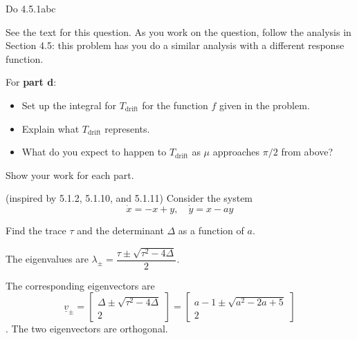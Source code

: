 \documentclass[12pt,letterpaper]{exam}
\begin{document}
\begin{questions}
\question Do 4.5.1abc

See the text for this question.  As you work on the question, follow the analysis in Section 4.5: this problem has you do a similar analysis with a different response function.

For \textbf{part d}: 
\begin{itemize}
    \item Set up the integral for $T_{\text{drift}}$ for the function $f$ given in the problem.
    \item Explain what $T_{\text{drift}}$ represents.
    \item What do you expect to happen to $T_{\text{drift}}$ as $\mu$ approaches $\pi/2$ from above?
\end{itemize}
  





Show your work for each part. 

\item (inspired by 5.1.2, 5.1.10, and 5.1.11) Consider the system
\[\dot x=-x+y,\quad \dot y=x-ay\] 
	\begin{parts}
	\item Find the trace $\tau$ and the determinant $\Delta$ as a function of $a$.
 \end{parts}
 
 The eigenvalues are $\lambda_\pm=\dfrac{\tau\pm\sqrt{\tau^2-4\Delta}}{2}$.  
 
 The corresponding eigenvectors are
	\[\underline{v}_\pm=\left[\begin{array}{c}
	\Delta\pm\sqrt{\tau^2-4\Delta}\\
	2
	\end{array}\right] = \left[\begin{array}{c}
	a-1\pm\sqrt{a^2-2a+5}\\
	2
	\end{array}\right]\].  The two eigenvectors are orthogonal.
 \begin{parts}
     \setcounter{partno}{1}




\end{parts}
\end{questions}
\end{document}
